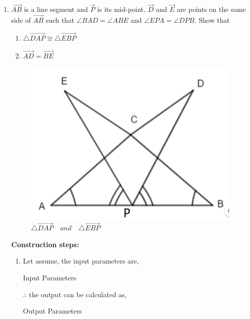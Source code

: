 \begin{enumerate}[label=\thesection.\arabic*.,ref=\thesection.\theenumi]
\item $\vec{AB}$ is a line segment and $\vec{P}$ is its mid-point. $\vec{D}$ and $\vec{E}$ are points on the same side of $\vec{AB}$ such that $\angle BAD = \angle ABE$ and $\angle EPA = \angle DPB$. Show that
		\begin{enumerate}
			\item $\triangle \vec{DAP} \cong  \triangle \vec{EBP}$
			\item $\vec{AD} = \vec{BE}$
\end{enumerate}
\begin{figure}[H]
    \includegraphics[width=\columnwidth]{figs/triangle/mc.png}
	\caption{$\triangle  \vec{DAP} \hspace{12pt} and \hspace{12pt} \triangle \vec{EBP}$}
 \label{fig:fig1}
\end{figure}
\pagebreak
\textbf{Construction steps:}
\\
		\begin{enumerate}[label=(\roman*)]

\item Let assume, the input parameters are, 
\begin{table}[H]
\centering
	
	  \caption{Input Parameters}
	  \label{Table-1: }
\end{table}

$\therefore$ the output can be calculated as,
\begin{table}[H]
\centering
	
	  \caption{Output Parameters}
	  \label{Table-2: }
\end{table}


\end{enumerate}
\end{enumerate}
